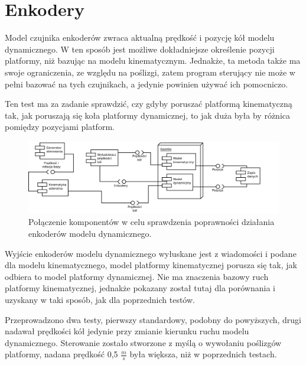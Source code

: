 \section{Enkodery}
	Model czujnika enkoderów zwraca aktualną prędkość i pozycję kół modelu dynamicznego.
	W ten sposób jest możliwe dokładniejsze określenie pozycji platformy, niż bazując na modelu kinematycznym.
	Jednakże, ta metoda także ma swoje ograniczenia, ze względu na poślizgi, zatem program sterujący nie może w pełni bazować na tych czujnikach, a jedynie powinien używać ich pomocniczo.
	
	Ten test ma za zadanie sprawdzić, czy gdyby poruszać platformą kinematyczną tak, jak poruszają się koła platformy dynamicznej, to jak duża była by różnica pomiędzy 
	pozycjami platform.
	
	\begin{figure}[H]
		\centering
		\includegraphics[width=\textwidth]{uml/encoders.pdf}
			\caption{Połączenie komponentów w celu sprawdzenia poprawności działania enkoderów modelu dynamicznego.}
		\label{plot:encoders}
	\end{figure}
	
	Wyjście enkoderów modelu dynamicznego wyłuskane jest z wiadomości i podane dla modelu kinematycznego, model platformy kinematycznej porusza się tak, jak odbiera to model platformy dynamicznej. Nie ma znaczenia bazowy ruch platformy kinematycznej, jednakże pokazany został tutaj dla porównania i uzyskany w taki sposób, jak dla poprzednich testów. 
	
	Przeprowadzono dwa testy, pierwszy standardowy, podobny do powyższych, drugi nadawał prędkości kół jedynie przy zmianie kierunku ruchu modelu dynamicznego.
	Sterowanie zostało stworzone z myślą o wywołaniu poślizgów platformy, nadana prędkość 0,5 $\frac{m}{s}$ była większa, niż w poprzednich testach.
	
